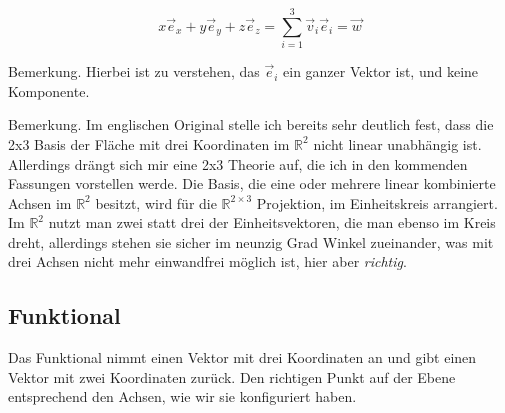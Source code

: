 \documentclass[a4paper]{article}
\begin{document}
\begin{displaymath}
x\vec{e}_{x} + y\vec{e}_{y} + z\vec{e}_{z} = \sum_{i=1}^{3}\vec{v}_{i}\vec{e}_{i} = \vec{w} 
\end{displaymath}

Bemerkung. Hierbei ist zu verstehen, das $\vec{e}_{i}$ ein ganzer Vektor ist, und keine Komponente.

Bemerkung. Im englischen Original stelle ich bereits sehr deutlich fest, dass die 2x3 Basis der Fl\"ache mit drei Koordinaten im $\mathbb{R}^{2}$ nicht linear unabh\"angig ist. Allerdings dr\"angt sich mir eine 2x3 Theorie auf, die ich in den kommenden Fassungen vorstellen werde. Die Basis, die eine oder mehrere linear kombinierte Achsen im $\mathbb{R}^{2}$ besitzt, wird f\"ur die $\mathbb{R}^{2\times3}$ Projektion, im Einheitskreis arrangiert. Im $\mathbb{R}^{2}$ nutzt man zwei statt drei der Einheitsvektoren, die man ebenso im Kreis dreht, allerdings stehen sie sicher im neunzig Grad Winkel zueinander, was mit drei Achsen nicht mehr einwandfrei m\"oglich ist, hier aber \emph{richtig}.


\subsection{Funktional}


Das Funktional nimmt einen Vektor mit drei Koordinaten an und gibt einen Vektor mit zwei Koordinaten zur\"uck. 
Den richtigen Punkt auf der Ebene entsprechend den Achsen, wie wir sie konfiguriert haben.\\
\end{document}
